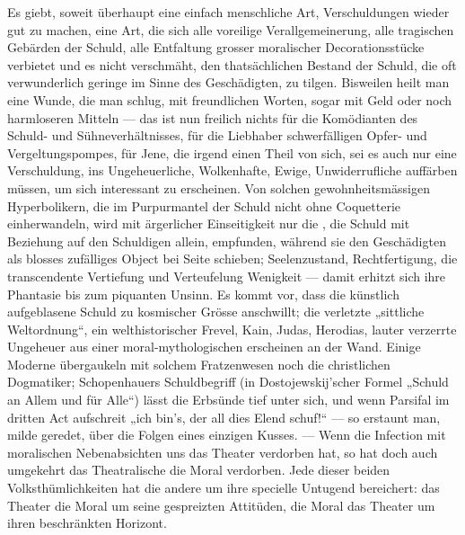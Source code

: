 Es giebt, soweit überhaupt  eine einfach menschliche Art, Verschuldungen wieder gut zu machen, eine Art, die sich alle voreilige Verallgemeinerung, alle tragischen Gebärden der Schuld, alle Entfaltung grosser moralischer Decorationsstücke verbietet und es nicht verschmäht, den thatsächlichen Bestand der Schuld, die oft verwunderlich geringe  im Sinne des Geschädigten, zu tilgen. Bisweilen heilt man eine Wunde, die man schlug, mit freundlichen Worten, sogar mit Geld oder noch harmloseren Mitteln — das ist nun freilich nichts für die Komödianten des Schuld- und Sühneverhältnisses, für die Liebhaber schwerfälligen Opfer- und Vergeltungspompes, für Jene, die irgend einen Theil von sich, sei es auch nur eine Verschuldung, ins Ungeheuerliche, Wolkenhafte, Ewige, Unwiderrufliche auffärben müssen, um sich interessant zu erscheinen. Von solchen gewohnheitsmässigen Hyperbolikern, die im Purpurmantel der Schuld nicht ohne Coquetterie einherwandeln, wird mit ärgerlicher Einseitigkeit nur die , die Schuld mit Beziehung auf den Schuldigen allein, empfunden, während sie den Geschädigten als blosses zufälliges Object bei Seite schieben;  Seelenzustand,  Rechtfertigung, die transcendente Vertiefung und Verteufelung  Wenigkeit — damit erhitzt sich ihre Phantasie bis zum piquanten Unsinn. Es kommt vor, dass die künstlich aufgeblasene Schuld zu kosmischer Grösse anschwillt; die verletzte „sittliche Weltordnung“, ein welthistorischer Frevel, Kain, Judas, Herodias, lauter verzerrte Ungeheuer aus einer moral-mythologischen  erscheinen an der Wand. Einige Moderne übergaukeln mit solchem Fratzenwesen noch die christlichen Dogmatiker; Schopenhauers Schuldbegriff (in Dostojewskij’scher Formel „Schuld an Allem und für Alle“) lässt die Erbsünde tief unter sich, und wenn Parsifal im dritten Act aufschreit „ich bin’s, der all dies Elend schuf!“ — so erstaunt man, milde geredet, über die Folgen eines einzigen Kusses. — Wenn die Infection mit moralischen Nebenabsichten uns das Theater verdorben hat, so hat doch auch umgekehrt das Theatralische die Moral verdorben. Jede dieser beiden Volksthümlichkeiten hat die andere um ihre specielle Untugend bereichert: das Theater die Moral um seine gespreizten Attitüden, die Moral das Theater um ihren beschränkten Horizont.
\par

